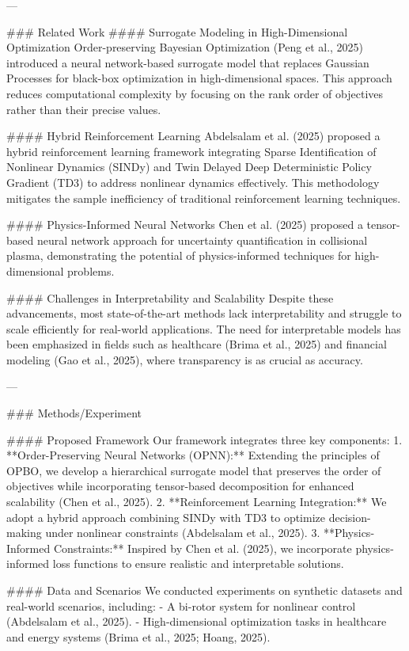 ---

### Related Work  
#### Surrogate Modeling in High-Dimensional Optimization  
Order-preserving Bayesian Optimization (Peng et al., 2025) introduced a neural network-based surrogate model that replaces Gaussian Processes for black-box optimization in high-dimensional spaces. This approach reduces computational complexity by focusing on the rank order of objectives rather than their precise values.

#### Hybrid Reinforcement Learning  
Abdelsalam et al. (2025) proposed a hybrid reinforcement learning framework integrating Sparse Identification of Nonlinear Dynamics (SINDy) and Twin Delayed Deep Deterministic Policy Gradient (TD3) to address nonlinear dynamics effectively. This methodology mitigates the sample inefficiency of traditional reinforcement learning techniques.

#### Physics-Informed Neural Networks  
Chen et al. (2025) proposed a tensor-based neural network approach for uncertainty quantification in collisional plasma, demonstrating the potential of physics-informed techniques for high-dimensional problems.

#### Challenges in Interpretability and Scalability  
Despite these advancements, most state-of-the-art methods lack interpretability and struggle to scale efficiently for real-world applications. The need for interpretable models has been emphasized in fields such as healthcare (Brima et al., 2025) and financial modeling (Gao et al., 2025), where transparency is as crucial as accuracy.

---

### Methods/Experiment  

#### Proposed Framework  
Our framework integrates three key components:  
1. **Order-Preserving Neural Networks (OPNN):** Extending the principles of OPBO, we develop a hierarchical surrogate model that preserves the order of objectives while incorporating tensor-based decomposition for enhanced scalability (Chen et al., 2025).  
2. **Reinforcement Learning Integration:** We adopt a hybrid approach combining SINDy with TD3 to optimize decision-making under nonlinear constraints (Abdelsalam et al., 2025).  
3. **Physics-Informed Constraints:** Inspired by Chen et al. (2025), we incorporate physics-informed loss functions to ensure realistic and interpretable solutions.

#### Data and Scenarios  
We conducted experiments on synthetic datasets and real-world scenarios, including:  
- A bi-rotor system for nonlinear control (Abdelsalam et al., 2025).  
- High-dimensional optimization tasks in healthcare and energy systems (Brima et al., 2025; Hoang, 2025).  

